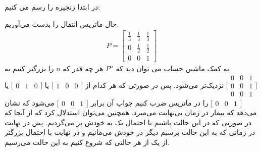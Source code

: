 در ابتدا زنجیره را رسم می کنیم:
\begin{latin}
    \begin{center}
    \end{center}
\end{latin}
حال ماتریس انتقال را بدست می‌آوریم.
\begin{gather*}
    P = \begin{bmatrix}
        \frac{1}{3} & \frac{1}{3} & \frac{1}{3}\\
        0 & \frac{1}{2} & \frac{1}{2} \\
        0 & 0 & 1
    \end{bmatrix}
\end{gather*}
به کمک ماشین حساب می توان دید که
$P^n$
هر چه قدر که
$n$
را بزرگتر کنیم به
$\big[\begin{smallmatrix}
    0 & 0 & 1\\
    0 & 0 & 1 \\
    0 & 0 & 1
\end{smallmatrix}\big]$
نزدیک‌تر می‌شود. پس در صورتی که هر کدام از
$\big[\begin{smallmatrix}
    1 & 0 & 0
\end{smallmatrix}\big]$
یا
$\big[\begin{smallmatrix}
    0 & 1 & 0
\end{smallmatrix}\big]$
یا
$\big[\begin{smallmatrix}
    0 & 0 & 1
\end{smallmatrix}\big]$
را در ماتریس ضرب کنیم جواب آن برابر
$\big[\begin{smallmatrix}
    0 & 0 & 1
\end{smallmatrix}\big]$
می‌شود که نشان می‌دهد که بیمار در زمان بی‌نهایت می‌میرد. همچنین می‌توان استدلال کرد که از آنجا که در صورتی که
در این حالت باشیم با احتمال یک به خودش بر می‌گردیم. پس در نهایت در زمانی که به این حالت برسیم
دیگر در خودش می‌مانیم و در نهایت با احتمال بزرگتر از یک از هر حالتی که شروع کنیم به این حالت می‌رسیم.

